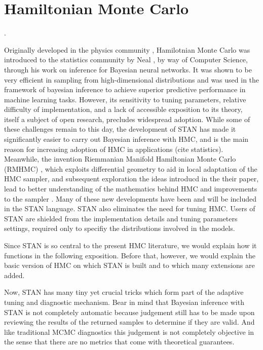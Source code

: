 \documentclass[]{report}
\begin{document}
\section{ Hamiltonian Monte Carlo }. 

Originally developed in the physics community \cite{duane1987hybrid},
Hamilotnian Monte Carlo was introduced to the statistics community by Neal
\cite{neal2012bayesian}, 
by way of Computer Science, through his work on inference for Bayesian neural
networks. It was shown to be very efficient in sampling from high-dimensional
distributions and was used in the framework of bayesian inference to achieve superior predictive
performance in machine learning tasks\cite{guyon2004result}. However, its sensitivity to tuning parameters, relative difficulty of
implementation, and a lack of accessible
exposition to its theory, itself a subject of open research, precludes
widespread adoption. While some of these challenges remain to this day, the development of STAN \cite{carpenter2016stan} has made it significantly easier to carry out Bayesian inference with HMC, and is the main reason for increasing adoption of HMC in applications (cite statistics). Meanwhile, the invention Riemmanian Manifold Hamiltonian Monte Carlo (RMHMC) \cite{girolami2011riemann}, which exploits differential geometry to aid in local adaptation of the HMC sampler, and subsequent exploration the ideas introducd in the their paper, lead to better understanding of the mathematics behind HMC \cite{livingstone2016geometric,betancourt2014geometric} and  improvements to the sampler \cite{betancourt2013generalizing,betancourt2013general}. Many of these new developments have been and will be included in the STAN language. STAN also eliminates the need for tuning HMC. Users of STAN are shielded from the implementation details and tuning parameters settings, required only to specifiy the distributions involved in the models. 

Since STAN is so central to the present HMC literature, we would explain how it functions in the following exposition. Before that, however, we would explain the basic version of HMC on which STAN is built and to which many extensions are added. 












Now, STAN has many tiny yet crucial tricks which form part of the adaptive
tuning and diagnostic mechanism. Bear in mind that Bayesian inference with STAN is not completely
automatic because judgement still has to be made upon reviewing the results of
the returned samples to determine if they are valid. And like traditional MCMC
diagnostics this judgement is not completely objective in the sense that there
are no metrics that come with theoretical guarantees. 
\end{document}
